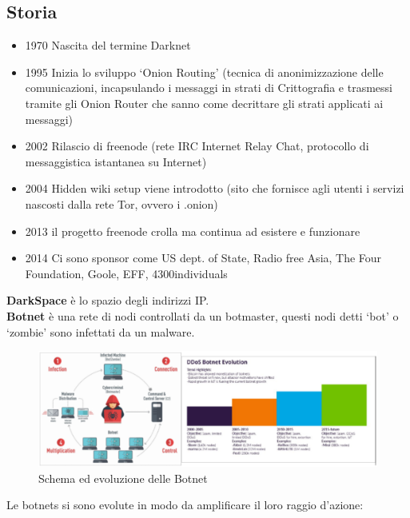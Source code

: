 \documentclass{article}
\begin{document}
\subsection{Storia}
\begin{itemize}
    \item 1970 Nascita del termine Darknet
    \item 1995 Inizia lo sviluppo ‘Onion Routing’ (tecnica di anonimizzazione delle comunicazioni, incapsulando i messaggi in strati di 
    Crittografia e trasmessi tramite gli Onion Router che sanno come decrittare gli strati applicati ai messaggi)
    \item 2002 Rilascio di freenode (rete IRC Internet Relay Chat, protocollo di messaggistica istantanea su Internet)
    \item 2004 Hidden wiki setup viene introdotto (sito che fornisce agli utenti i servizi nascosti dalla rete Tor, ovvero i .onion)
    \item 2013 il progetto freenode crolla ma continua ad esistere e funzionare
    \item 2014 Ci sono sponsor come US dept. of State,  Radio free Asia, The Four Foundation, Goole, EFF, 4300individuals
\end{itemize}
\textbf{DarkSpace} è lo spazio degli indirizzi IP. \\
\textbf{Botnet} è una rete di nodi controllati da un botmaster, questi nodi detti ‘bot’ o ‘zombie’ sono infettati da un malware.\\
\begin{figure}[H]
    \center
    \includegraphics[scale=0.22]{images/DK1.png}
    \caption{Schema ed evoluzione delle Botnet}\label{fig:1}
\end{figure}
Le botnets si sono evolute in modo da amplificare il loro raggio d’azione:
\end{document}
